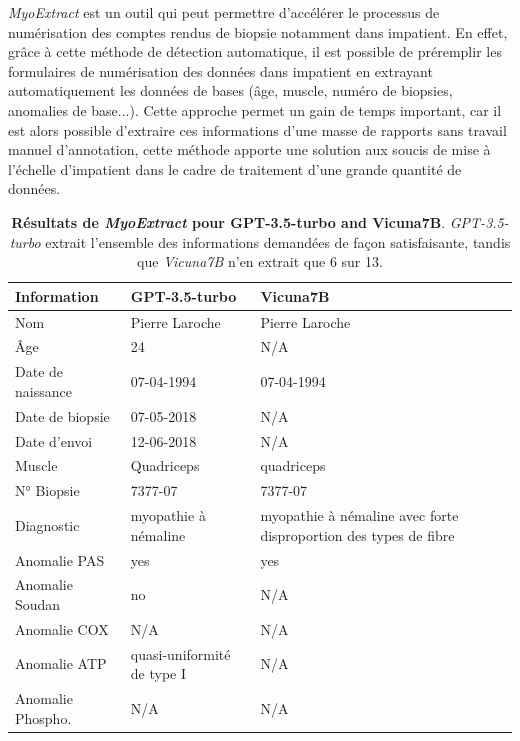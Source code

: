 \textit{MyoExtract} est un outil qui peut permettre d'accélérer le processus de numérisation des comptes rendus de biopsie notamment dans \gls{impatient}. En effet, grâce à cette méthode de détection automatique, il est possible de préremplir les formulaires de numérisation des données dans \gls{impatient} en extrayant automatiquement les données de bases (âge, muscle, numéro de biopsies, anomalies de base...). Cette approche permet un gain de temps important, car il est alors possible d'extraire ces informations d'une masse de rapports sans travail manuel d'annotation, cette méthode apporte une solution aux soucis de mise à l'échelle d'\gls{impatient} dans le cadre de traitement d'une grande quantité de données.
\begin{table}[!ht]
\centering
\caption[Résultats de \textit{MyoExtract} pour \textit{GPT-3.5-turbo} and \textit{Vicuna7B}]{\textbf{Résultats de \textit{MyoExtract} pour GPT-3.5-turbo and Vicuna7B}. \textit{GPT-3.5-turbo} extrait l'ensemble des informations demandées de façon satisfaisante, tandis que \textit{Vicuna7B} n'en extrait que 6 sur 13.}
\label{tab:json_data}
\begin{tabularx}{\textwidth}{|l|X|X|}
\hline
\textbf{Information} & \textbf{GPT-3.5-turbo} & \textbf{Vicuna7B} \\ \hline
Nom & Pierre Laroche & Pierre Laroche \\ \hline
Âge & 24 & N/A \\ \hline
Date de naissance & 07-04-1994 & 07-04-1994 \\ \hline
Date de biopsie & 07-05-2018 & N/A \\ \hline
Date d'envoi & 12-06-2018 & N/A \\ \hline
Muscle & Quadriceps & quadriceps \\ \hline
N° Biopsie & 7377-07 & 7377-07 \\ \hline
Diagnostic & myopathie à némaline & myopathie à némaline avec forte disproportion des types de fibre \\ \hline
Anomalie PAS & yes & yes \\ \hline
Anomalie Soudan & no & N/A \\ \hline
Anomalie COX & N/A & N/A \\ \hline
Anomalie ATP & quasi-uniformité de type I & N/A \\ \hline
Anomalie Phospho. & N/A & N/A \\ \hline
\end{tabularx}
\end{table}

